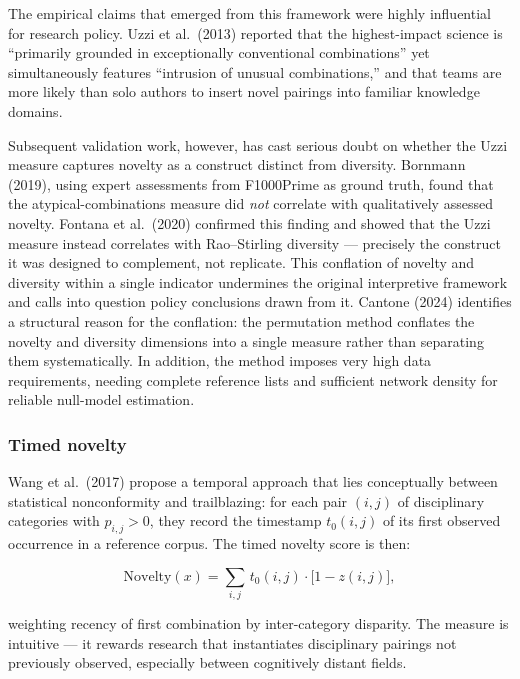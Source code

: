 \documentclass[
]{article}
\begin{document}
The empirical claims that emerged from this framework were highly
influential for research policy. Uzzi et al.~(2013) reported that the
highest-impact science is ``primarily grounded in exceptionally
conventional combinations'' yet simultaneously features ``intrusion of
unusual combinations,'' and that teams are more likely than solo authors
to insert novel pairings into familiar knowledge domains.

Subsequent validation work, however, has cast serious doubt on whether
the Uzzi measure captures novelty as a construct distinct from
diversity. Bornmann (2019), using expert assessments from F1000Prime as
ground truth, found that the atypical-combinations measure did
\emph{not} correlate with qualitatively assessed novelty. Fontana et
al.~(2020) confirmed this finding and showed that the Uzzi measure
instead correlates with Rao--Stirling diversity --- precisely the
construct it was designed to complement, not replicate. This conflation
of novelty and diversity within a single indicator undermines the
original interpretive framework and calls into question policy
conclusions drawn from it. Cantone (2024) identifies a structural reason
for the conflation: the permutation method conflates the novelty and
diversity dimensions into a single measure rather than separating them
systematically. In addition, the method imposes very high data
requirements, needing complete reference lists and sufficient network
density for reliable null-model estimation.

\hypertarget{timed-novelty}{%
\subsubsection{Timed novelty}\label{timed-novelty}}

Wang et al.~(2017) propose a temporal approach that lies conceptually
between statistical nonconformity and trailblazing: for each pair
\((i,j)\) of disciplinary categories with \(p_{i,j} > 0\), they record
the timestamp \(t_0(i,j)\) of its first observed occurrence in a
reference corpus. The timed novelty score is then:

\[\mathrm{Novelty}(x) = \sum_{i,j}\, t_0(i,j) \cdot \bigl[1 - z(i,j)
\bigr],\]

weighting recency of first combination by inter-category disparity. The
measure is intuitive --- it rewards research that instantiates
disciplinary pairings not previously observed, especially between
cognitively distant fields.
\end{document}
